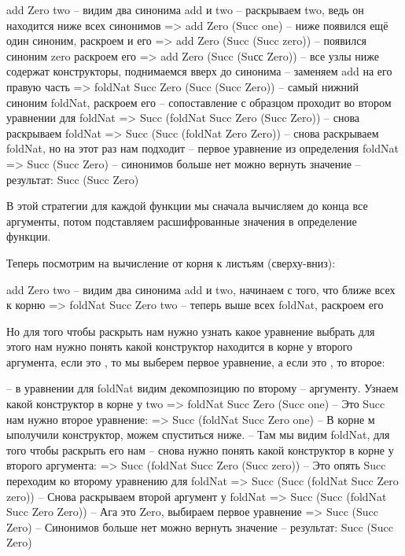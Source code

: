 \begin{code}
        add Zero two                    
-- видим два синонима add и two 
-- раскрываем two, ведь он находится ниже всех синонимов
=>      add Zero (Succ one)    
-- ниже появился ещё один синоним, раскроем и его
=>      add Zero (Succ (Succ zero))    
-- появился синоним zero раскроем его
=>      add Zero (Succ (Suсс Zero))
-- все узлы ниже содержат конструкторы, поднимаемся вверх до синонима
-- заменяем add на его правую часть
=>      foldNat Succ Zero (Succ (Succ Zero))  
-- самый нижний синоним foldNat, раскроем его
-- сопоставление с образцом проходит во втором уравнении для foldNat
=>      Succ (foldNat Succ Zero (Succ Zero))
-- снова раскрываем foldNat
=>      Succ (Succ (foldNat Zero Zero))
-- снова раскрываем foldNat, но на этот раз нам подходит
-- первое уравнение из определения foldNat
=>      Succ (Succ Zero)
-- синонимов больше нет можно вернуть значение
-- результат:
        Succ (Succ Zero)
\end{code}

В этой стратегии для каждой функции мы сначала вычисляем до конца все
аргументы, потом подставляем расшифрованные значения в определение
функции.

Теперь посмотрим на вычисление от корня к листьям (сверху-вниз):


\begin{code}
        add Zero two
-- видим два синонима add и two, начинаем с того, что ближе всех к корню
=>      foldNat Succ Zero two
-- теперь выше всех foldNat, раскроем его
\end{code}

Но для того чтобы раскрыть  нам нужно узнать какое уравнение
выбрать для этого нам нужно понять какой конструктор находится в корне у
второго аргумента, если это , то мы выберем первое уравнение, а
если это , то второе:


\begin{code}
-- в уравнении для foldNat видим декомпозицию по второму 
-- аргументу. Узнаем какой конструктор в корне у two
=>      foldNat Succ Zero (Succ one)
-- Это Succ нам нужно второе уравнение:
=>      Succ (foldNat Succ Zero one)
-- В корне м ыполучили конструктор, можем спуститься ниже.
-- Там мы видим foldNat, для того чтобы раскрыть его нам
-- снова нужно понять какой конструктор в корне у второго аргумента:
=>      Succ (foldNat Succ Zero (Succ zero))
-- Это опять Succ переходим ко второму уравнению для foldNat
=>      Succ (Succ (foldNat Succ Zero zero))
-- Снова раскрываем второй аргумент у foldNat
=>      Succ (Succ (foldNat Succ Zero Zero))
-- Ага это Zero, выбираем первое уравнение
=>      Succ (Succ Zero)
-- Синонимов больше нет можно вернуть значение
-- результат:
        Succ (Succ Zero)
\end{code}

